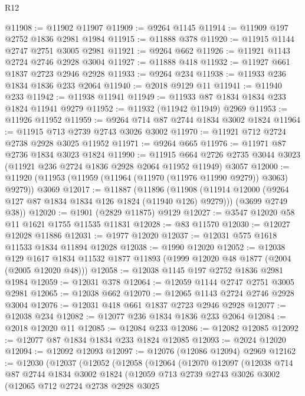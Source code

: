\begin{lexlean}{R12}
\begin{coremodule}
@11908 := @11902 @11907
@11909 := @9264 @1145
@11914 := @11909 @197 @2752 @1836 @2981 @1984
@11915 := @11888 @378
@11920 := @11915 @1144 @2747 @2751 @3005 @2981
@11921 := @9264 @662
@11926 := @11921 @1143 @2724 @2746 @2928 @3004
@11927 := @11888 @418
@11932 := @11927 @661 @1837 @2723 @2946 @2928
@11933 := @9264 @234
@11938 := @11933 @236 @1834 @1836 @233 @2064
@11940 := @2018 @9129 @11
@11941 := @11940 @233
@11942 := @11938 @11941
@11949 := @11933 @87 @1834 @1834 @233 @1824 @11941 @9279
@11952 := @11932 (@11942 @11949) @2969
@11953 := @11926 @11952
@11959 := @9264 @714 @87 @2744 @1834 @3002 @1824
@11964 := @11915 @713 @2739 @2743 @3026 @3002
@11970 := @11921 @712 @2724 @2738 @2928 @3025 @11952
@11971 := @9264 @665
@11976 := @11971 @87 @2736 @1834 @3023 @1824
@11990 := @11915
    @664
    @2726
    @2735
    @3044
    @3023
    (@11921 @236 @2724 @1836 @2928 @2064 @11952 @11949)
    @3057
@12000 := @11920 (@11953 (@11959 (@11964 (@11970 (@11976 @11990 @9279)) @3063) @9279)) @3069
@12017 := @11887
    (@11896
      (@11908 (@11914 @12000 (@9264 @127 @87 @1834 @1834 @126 @1824 (@11940 @126) @9279)))
      (@3699 @2749 @38))
@12020 := @1901 (@2829 @11875) @9129
@12027 := @3547 @12020 @58 @11 @1621 @1755 @11535 @11831
@12028 := @83 @11570
@12030 := @12027 @12028 @11886
@12031 := @1977 @12020
@12037 := @12031 @575 @1618 @11533 @1834 @11894 @12028
@12038 := @1990 @12020
@12052 := @12038
    @129
    @1617
    @1834
    @11532
    @1877
    @11893
    (@1999 @12020 @48 @1877 (@2004 (@2005 @12020 @48)))
@12058 := @12038 @1145 @197 @2752 @1836 @2981 @1984
@12059 := @12031 @378
@12064 := @12059 @1144 @2747 @2751 @3005 @2981
@12065 := @12038 @662
@12070 := @12065 @1143 @2724 @2746 @2928 @3004
@12076 := @12031 @418 @661 @1837 @2723 @2946 @2928
@12077 := @12038 @234
@12082 := @12077 @236 @1834 @1836 @233 @2064
@12084 := @2018 @12020 @11
@12085 := @12084 @233
@12086 := @12082 @12085
@12092 := @12077 @87 @1834 @1834 @233 @1824 @12085
@12093 := @2024 @12020
@12094 := @12092 @12093
@12097 := @12076 (@12086 @12094) @2969
@12162 := @12030
    (@12037
      (@12052
        (@12058
          (@12064
            (@12070
              @12097
              (@12038
                @714
                @87
                @2744
                @1834
                @3002
                @1824
                (@12059
                  @713
                  @2739
                  @2743
                  @3026
                  @3002
                  (@12065
                    @712
                    @2724
                    @2738
                    @2928
                    @3025

\end{coremodule}
\end{lexlean}
